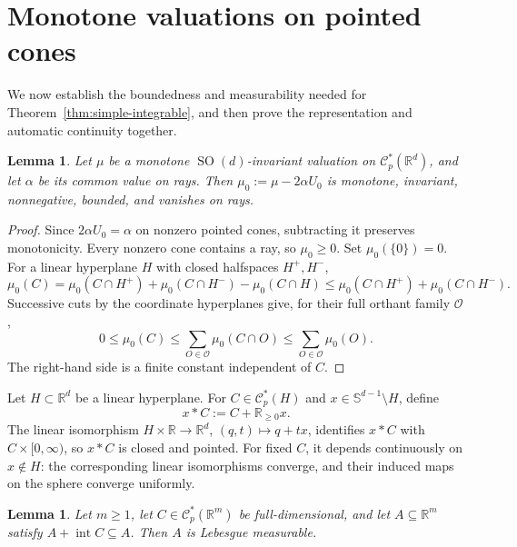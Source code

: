 \documentclass[11pt]{article}
\newcommand{\R}{\mathbb{R}}
\newcommand{\CC}{\mathcal{C}}
\newcommand{\sphere}[1]{\mathbb{S}^{#1}}
\newcommand{\SOn}[1]{\operatorname{SO}(#1)}
\newcommand{\vct}[1]{#1}
\newcommand{\zero}{\vct{0}}
\newcommand{\inter}{\operatorname{int}}
\theoremstyle{plain}
\newtheorem{lemma}[theorem]{Lemma}
\theoremstyle{definition}
\begin{document}
\section{Monotone valuations on pointed cones}\label{sec:monotone-cone}

We now establish the boundedness and measurability needed for
Theorem~\ref{thm:simple-integrable}, and then prove the representation
and automatic continuity together.

\begin{lemma}\label{lem:normalization}
Let $\mu$ be a monotone $\SOn d$-invariant valuation on
$\CC_p^*(\R^d)$, and let $\alpha$ be its common value on rays.
Then $\mu_0:=\mu-2\alpha U_0$ is monotone, invariant, nonnegative,
bounded, and vanishes on rays.
\end{lemma}

\begin{proof}
Since $2\alpha U_0=\alpha$ on nonzero pointed cones, subtracting it
preserves monotonicity.  Every nonzero cone contains a ray, so
$\mu_0\ge0$.  Set $\mu_0(\{\zero\})=0$.
For a linear hyperplane $H$ with closed halfspaces $H^+,H^-$,
\[
  \mu_0(C)
  =\mu_0(C\cap H^+)+\mu_0(C\cap H^-)-\mu_0(C\cap H)
  \le\mu_0(C\cap H^+)+\mu_0(C\cap H^-).
\]
Successive cuts by the coordinate hyperplanes give, for their full
orthant family $\mathcal O$,
\[
  0\le\mu_0(C)
  \le\sum_{O\in\mathcal O}\mu_0(C\cap O)
  \le\sum_{O\in\mathcal O}\mu_0(O).
\]
The right-hand side is a finite constant independent of $C$.
\end{proof}

Let $H\subset\R^d$ be a linear hyperplane.  For
$C\in\CC_p^*(H)$ and $x\in\sphere{d-1}\setminus H$, define
\begin{equation}\label{eq:coning-operation}
  x*C:=C+\R_{\ge0}x.
\end{equation}
The linear isomorphism $H\times\R\to\R^d$,
$(q,t)\mapsto q+tx$, identifies $x*C$ with $C\times[0,\infty)$,
so $x*C$ is closed and pointed.
For fixed $C$, it depends continuously on $x\notin H$:
the corresponding linear isomorphisms converge, and their induced
maps on the sphere converge uniformly.

\begin{lemma}\label{lem:measure}
Let $m\ge1$, let $C\in\CC_p^*(\R^m)$ be full-dimensional, and let
$A\subseteq\R^m$ satisfy $A+\inter C\subseteq A$.
Then $A$ is Lebesgue measurable.
\end{lemma}
\end{document}
